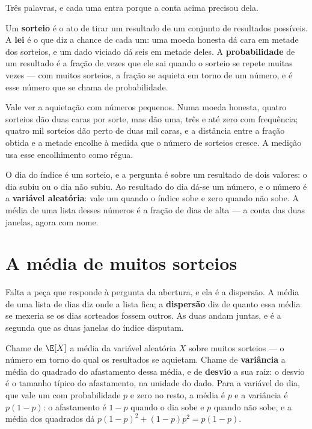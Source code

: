 Três palavras, e cada uma entra porque a conta acima precisou dela.

Um \textbf{sorteio} é o ato de tirar um resultado de um conjunto de resultados possíveis. A
\textbf{lei} é o que diz a chance de cada um: uma moeda honesta dá cara em metade dos sorteios,
e um dado viciado dá seis em metade deles.
A \textbf{probabilidade} de um resultado é a fração
de vezes que ele sai quando o sorteio se repete muitas vezes --- com muitos sorteios, a fração
se aquieta em torno de um número, e é esse número que se chama de probabilidade.

Vale ver a aquietação com números pequenos. Numa moeda honesta, quatro sorteios dão duas caras
por sorte, mas dão uma, três e até zero com frequência; quatro mil sorteios dão perto de duas
mil caras, e a distância entre a fração obtida e a metade encolhe à medida que o número de
sorteios cresce. A medição usa esse encolhimento como régua.

O dia do índice é um sorteio, e a pergunta é sobre um resultado de dois valores: o
dia subiu ou o dia não subiu. Ao resultado do dia dá-se um número, e o número é a
\textbf{variável aleatória}: vale um quando o índice sobe e zero quando não sobe. A
média de uma lista desses números é a fração de dias de alta --- a conta das duas janelas, agora
com nome.

\section{A média de muitos sorteios}

Falta a peça que responde à pergunta da abertura, e ela é a dispersão. A média de uma lista de
dias diz onde a lista fica; a \textbf{dispersão} diz de quanto essa média se mexeria se os dias
sorteados fossem outros. As duas andam juntas, e é a segunda que as duas janelas do índice
disputam.

Chame de $\E[X]$ a média da variável aleatória $X$ sobre muitos sorteios --- o número em torno
do qual os resultados se aquietam.
Chame de \textbf{variância} a média do quadrado do
afastamento dessa média, e de \textbf{desvio} a sua raiz: o desvio é o tamanho típico do
afastamento, na unidade do dado. Para a variável do dia, que vale um com probabilidade $p$ e
zero no resto, a média é $p$ e a variância é $p(1-p)$: o afastamento é $1-p$ quando o dia sobe
e $p$ quando não sobe, e a média dos quadrados dá $p(1-p)^2 + (1-p)p^2 = p(1-p)$.

